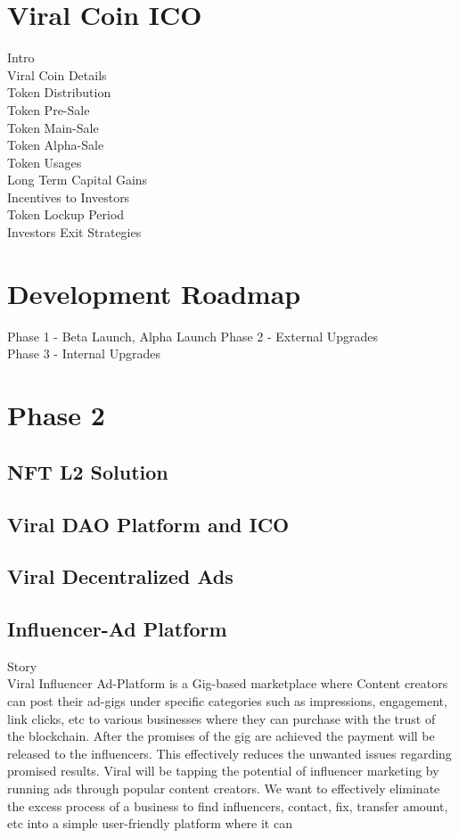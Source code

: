 \documentclass[10pt]{article}
\begin{document}
\section{Viral Coin ICO}
Intro\\
Viral Coin Details\\
Token Distribution\\
Token Pre-Sale\\
Token Main-Sale\\
Token Alpha-Sale\\
Token Usages\\
Long Term Capital Gains\\
Incentives to Investors\\
Token Lockup Period\\
Investors Exit Strategies\\

\section{Development Roadmap}

Phase 1 - Beta Launch, Alpha Launch
Phase 2 - External Upgrades\\
Phase 3 - Internal Upgrades\\

\section{Phase 2}

\subsection{NFT L2 Solution}

\subsection{Viral DAO Platform and ICO}

\subsection{Viral Decentralized Ads}

\subsection{Influencer-Ad Platform}

Story\\

Viral Influencer Ad-Platform is a Gig-based marketplace where Content creators can post their ad-gigs under specific categories such as impressions, engagement, link clicks, etc to various businesses where they can purchase with the trust of the blockchain. After the promises of the gig are achieved the payment will be released to the influencers. This effectively reduces the unwanted issues regarding promised results. Viral will be tapping the potential of influencer marketing by running ads through popular content creators. We want to effectively eliminate the excess process of a business to find influencers, contact, fix, transfer amount, etc into a simple user-friendly platform where it can\\
\end{document}

